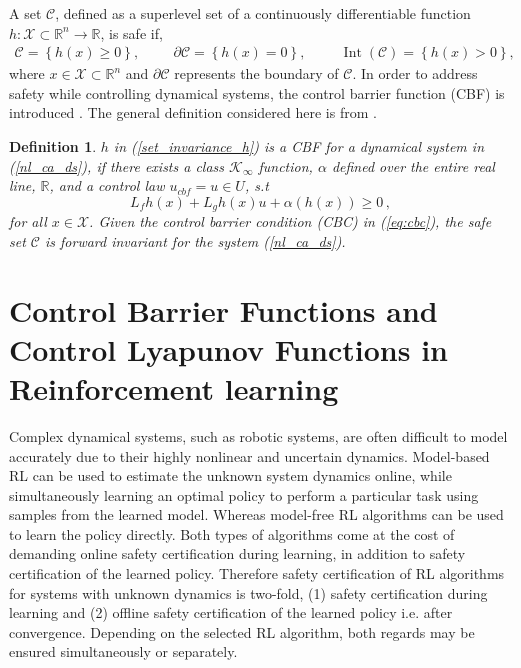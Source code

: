 \documentclass[3p,times,procedia]{elsarticle}
\newtheorem{definition}{Definition}
\begin{document}
A set $\mathcal{C}$, defined as a superlevel set of a continuously differentiable function $h : \mathcal{X} \subset \mathbb{R}^{n} \to \mathbb{R}$, is safe if,
    \begin{equation} \label{set_invariance_h}
        \begin{aligned}
            \mathcal{C}=\left\{ h(x) \geq 0\right\} , \hspace{1cm}
            \partial \mathcal{C}=\left\{ h(x)=0\right\} , \hspace{1cm}
            \operatorname{Int}(\mathcal{C})=\left\{ h(x)>0\right\},
        \end{aligned}
    \end{equation}
    where $x \in \mathcal{X} \subset \mathbb{R}^{n}$ and $\partial \mathcal{C}$ represents the boundary of $\mathcal{C}$. In order to address safety while controlling dynamical systems, the control barrier function (CBF) is introduced \cite{Wieland2007}. The general definition considered here is from \cite{Ames2019}. 
    \begin{definition}
       $h$ in (\ref{set_invariance_h}) is a CBF for a dynamical system in (\ref{nl_ca_ds}), if there exists a class $\mathcal{K}_{\infty}$ function, $\alpha$ defined over the entire real line, $\mathbb{R}$, and a control law $u_{cbf} = u \in U$, s.t
    \begin{equation}\label{eq:cbc}
        L_{f} h(x)+L_{g} h(x) u+\alpha(h(x)) \geq 0 \, ,
    \end{equation}
    for all $x \in \mathcal{X}$. Given the control barrier condition (CBC) in (\ref{eq:cbc}), the safe set $\mathcal{C}$ is forward invariant for the system (\ref{nl_ca_ds}).
   \end{definition}




\section{Control Barrier Functions and Control Lyapunov Functions in Reinforcement learning} \label{RL}

Complex dynamical systems, such as robotic systems, are often difficult to model accurately due to their highly nonlinear and uncertain dynamics. Model-based RL can be used to estimate the unknown system dynamics online, while simultaneously learning an optimal policy to perform a particular task using samples from the learned model. Whereas model-free RL algorithms can be used to learn the policy directly. Both types of algorithms come at the cost of demanding online safety certification during learning, in addition to safety certification of the learned policy. Therefore safety certification of RL algorithms for systems with unknown dynamics is two-fold, (1) safety certification during learning and (2) offline safety certification of the learned policy i.e. after convergence. Depending on the selected RL algorithm, both regards may be ensured simultaneously or separately.
\end{document}

